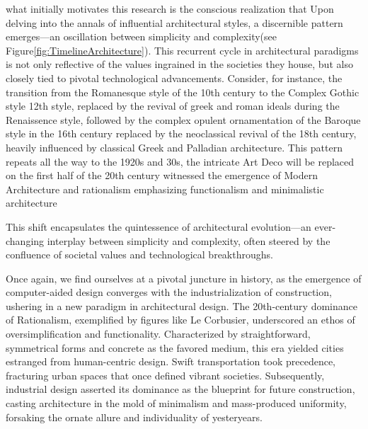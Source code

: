 what initially motivates this research is the conscious realization that
Upon delving into the annals of influential architectural styles, a discernible pattern emerges—an oscillation between simplicity and complexity(see Figure\ref{fig:TimelineArchitecture}).
This recurrent cycle in architectural paradigms is not only reflective of the values ingrained in the societies they house, but also closely tied to pivotal technological advancements.
Consider, for instance, the transition from the Romanesque style of the 10th century to the Complex Gothic style 12th style, replaced by the revival of greek and roman ideals during the Renaissence style, followed by the complex opulent ornamentation of the Baroque style in the 16th century replaced by the neoclassical revival of the 18th century, heavily influenced by classical Greek and Palladian architecture\cite{Arora2023}.
This pattern repeats all the way to the 1920s and 30s, the intricate Art Deco will be replaced on the first half of the 20th century witnessed the emergence of Modern Architecture and rationalism emphasizing functionalism and minimalistic architecture




This shift encapsulates the quintessence of architectural evolution—an ever-changing interplay between simplicity and complexity, often steered by the confluence of societal values and technological breakthroughs.


Once again, we find ourselves at a pivotal juncture in history, as the emergence of computer-aided design converges with the industrialization of construction, ushering in a new paradigm in architectural design.
The 20th-century dominance of Rationalism, exemplified by figures like Le Corbusier, underscored an ethos of oversimplification and functionality.
Characterized by straightforward, symmetrical forms and concrete as the favored medium, this era yielded cities estranged from human-centric design.
Swift transportation took precedence, fracturing urban spaces that once defined vibrant societies\cite{Stacbond2020}.
Subsequently, industrial design asserted its dominance as the blueprint for future construction\cite{Economakis2023}, casting architecture in the mold of minimalism and mass-produced uniformity, forsaking the ornate allure and individuality of yesteryears.

